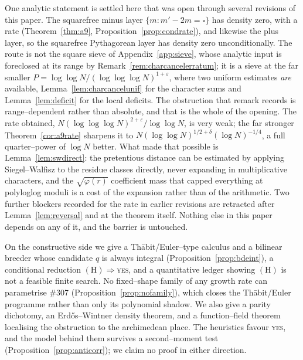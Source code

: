 \documentclass[11pt]{article}
\theoremstyle{definition}
\begin{document}
One analytic statement is settled here that was open through several revisions of this paper. The
squarefree minus layer $\{m:m'-2m=\square\}$ has density zero, with a rate
(Theorem~\ref{thm:a9}, Proposition~\ref{prop:condrate}), and likewise the plus layer, so the
squarefree Pythagorean layer has density zero unconditionally. The route is not the square sieve of
Appendix~\ref{app:sieve}, whose analytic input is foreclosed at its range by
Remark~\ref{rem:charcancelerratum}; it is a sieve at the far smaller
$P=\log\log N/(\log\log\log N)^{1+\varepsilon}$, where two uniform estimates \emph{are} available, Lemma~\ref{lem:charcancelunif} for the character sums and Lemma~\ref{lem:deficit} for the local
deficits. The obstruction that remark records is range--dependent rather than
absolute, and that is the whole of the opening. The rate obtained,
$N(\log\log\log N)^{2+\varepsilon}/\log\log N$, is very weak; the far stronger
Theorem~\ref{cor:a9rate} sharpens it to
$N(\log\log N)^{1/2+\delta}(\log N)^{-1/4}$, a full quarter--power of $\log N$ better. What made that
possible is Lemma~\ref{lem:swdirect}: the pretentious distance can be estimated by applying
Siegel--Walfisz to the residue classes directly, never expanding in multiplicative characters, and
the $\sqrt{\varphi(r)}$ coefficient mass that capped everything at polyloglog moduli is a cost of the
expansion rather than of the arithmetic. Two further blockers recorded for the rate in earlier
revisions are retracted after Lemma~\ref{lem:reversal} and at the theorem itself. Nothing else in this paper
depends on any of it, and the barrier is untouched.

On the constructive side we give a Th\=abit/Euler--type calculus and a bilinear breeder whose
candidate $q$ is always integral (Proposition~\ref{prop:bdeint}), a conditional reduction
$(\mathrm{H})\Rightarrow$\textsc{yes}, and a quantitative ledger showing $(\mathrm{H})$ is not a
feasible finite search. No fixed--shape family of any growth rate can parametrise \#307
(Proposition~\ref{prop:nofamily}), which closes the Th\=abit/Euler programme rather than only its
polynomial shadow. We also give a parity dichotomy, an Erd\H{o}s--Wintner density theorem, and a
function--field theorem localising the obstruction to the archimedean place. The heuristics favour
\textsc{yes}, and the model behind them survives a second--moment test
(Proposition~\ref{prop:anticorr}); we claim no proof in either direction.
\end{document}
